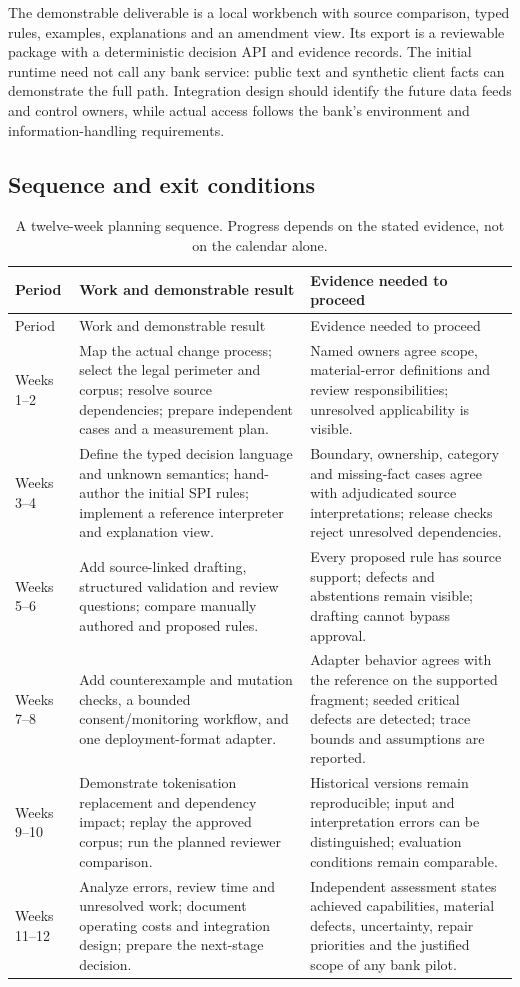 The demonstrable deliverable is a local workbench with source comparison, typed
rules, examples, explanations and an amendment view. Its export is a reviewable
package with a deterministic decision API and evidence records. The initial
runtime need not call any bank service: public text and synthetic client facts
can demonstrate the full path. Integration design should identify the future
data feeds and control owners, while actual access follows the bank's environment
and information-handling requirements.

\subsection{Sequence and exit conditions}

\begingroup\small
\begin{longtable}{P{0.12\textwidth}P{0.42\textwidth}P{0.36\textwidth}}
\caption{A twelve-week planning sequence. Progress depends on the stated evidence,
not on the calendar alone.}\label{tab:phases}\\
\toprule Period & Work and demonstrable result & Evidence needed to proceed \\\midrule
\endfirsthead
\toprule Period & Work and demonstrable result & Evidence needed to proceed \\\midrule
\endhead
Weeks 1--2 & Map the actual change process; select the legal perimeter and corpus;
resolve source dependencies; prepare independent cases and a measurement plan. &
Named owners agree scope, material-error definitions and review responsibilities;
unresolved applicability is visible.\\
Weeks 3--4 & Define the typed decision language and unknown semantics; hand-author
the initial SPI rules; implement a reference interpreter and explanation view. &
Boundary, ownership, category and missing-fact cases agree with adjudicated source
interpretations; release checks reject unresolved dependencies.\\
Weeks 5--6 & Add source-linked drafting, structured validation and review questions;
compare manually authored and proposed rules. &
Every proposed rule has source support; defects and abstentions remain visible;
drafting cannot bypass approval.\\
Weeks 7--8 & Add counterexample and mutation checks, a bounded consent/monitoring
workflow, and one deployment-format adapter. &
Adapter behavior agrees with the reference on the supported fragment; seeded
critical defects are detected; trace bounds and assumptions are reported.\\
Weeks 9--10 & Demonstrate tokenisation replacement and dependency impact; replay
the approved corpus; run the planned reviewer comparison. &
Historical versions remain reproducible; input and interpretation errors can be
distinguished; evaluation conditions remain comparable.\\
Weeks 11--12 & Analyze errors, review time and unresolved work; document operating
costs and integration design; prepare the next-stage decision. &
Independent assessment states achieved capabilities, material defects, uncertainty,
repair priorities and the justified scope of any bank pilot.\\
\bottomrule
\end{longtable}
